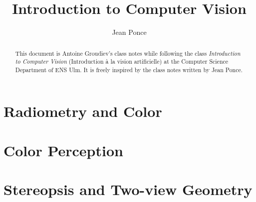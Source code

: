 \documentclass[toc, titlepaged]{../cs-classes/cs-classes}
\title{Introduction to Computer Vision}
\author{Jean Ponce}
\begin{document}
\begin{abstract}
    This document is Antoine Groudiev's class notes while following the class \emph{Introduction to Computer Vision} (Introduction à la vision artificielle) at the Computer Science Department of ENS Ulm. It is freely inspired by the class notes written by Jean Ponce.
\end{abstract}







\section{Radiometry and Color}
\section{Color Perception}
\section{Stereopsis and Two-view Geometry}

\end{document}
